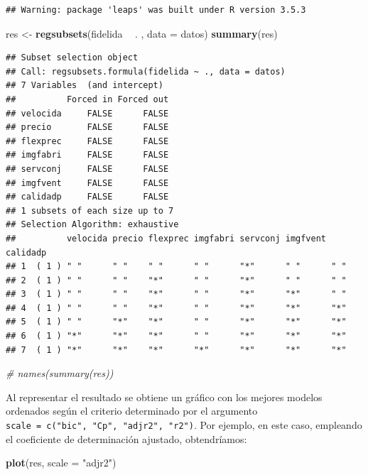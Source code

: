 \documentclass[]{book}
\newenvironment{Shaded}{\begin{snugshade}}{\end{snugshade}}
\newcommand{\KeywordTok}[1]{\textcolor[rgb]{0.13,0.29,0.53}{\textbf{#1}}}
\newcommand{\DataTypeTok}[1]{\textcolor[rgb]{0.13,0.29,0.53}{#1}}
\newcommand{\StringTok}[1]{\textcolor[rgb]{0.31,0.60,0.02}{#1}}
\newcommand{\CommentTok}[1]{\textcolor[rgb]{0.56,0.35,0.01}{\textit{#1}}}
\newcommand{\OperatorTok}[1]{\textcolor[rgb]{0.81,0.36,0.00}{\textbf{#1}}}
\newcommand{\NormalTok}[1]{#1}
\begin{document}
\begin{verbatim}
## Warning: package 'leaps' was built under R version 3.5.3
\end{verbatim}

\begin{Shaded}
\begin{Highlighting}[]
\NormalTok{res <-}\StringTok{ }\KeywordTok{regsubsets}\NormalTok{(fidelida }\OperatorTok{~}\StringTok{ }\NormalTok{. , }\DataTypeTok{data =}\NormalTok{ datos)}
\KeywordTok{summary}\NormalTok{(res)}
\end{Highlighting}
\end{Shaded}

\begin{verbatim}
## Subset selection object
## Call: regsubsets.formula(fidelida ~ ., data = datos)
## 7 Variables  (and intercept)
##          Forced in Forced out
## velocida     FALSE      FALSE
## precio       FALSE      FALSE
## flexprec     FALSE      FALSE
## imgfabri     FALSE      FALSE
## servconj     FALSE      FALSE
## imgfvent     FALSE      FALSE
## calidadp     FALSE      FALSE
## 1 subsets of each size up to 7
## Selection Algorithm: exhaustive
##          velocida precio flexprec imgfabri servconj imgfvent calidadp
## 1  ( 1 ) " "      " "    " "      " "      "*"      " "      " "     
## 2  ( 1 ) " "      " "    "*"      " "      "*"      " "      " "     
## 3  ( 1 ) " "      " "    "*"      " "      "*"      "*"      " "     
## 4  ( 1 ) " "      " "    "*"      " "      "*"      "*"      "*"     
## 5  ( 1 ) " "      "*"    "*"      " "      "*"      "*"      "*"     
## 6  ( 1 ) "*"      "*"    "*"      " "      "*"      "*"      "*"     
## 7  ( 1 ) "*"      "*"    "*"      "*"      "*"      "*"      "*"
\end{verbatim}

\begin{Shaded}
\begin{Highlighting}[]
\CommentTok{# names(summary(res))}
\end{Highlighting}
\end{Shaded}

Al representar el resultado se obtiene un gráfico con los mejores
modelos ordenados según el criterio determinado por el argumento
\texttt{scale\ =\ c("bic",\ "Cp",\ "adjr2",\ "r2")}. Por ejemplo, en
este caso, empleando el coeficiente de determinación ajustado,
obtendríamos:

\begin{Shaded}
\begin{Highlighting}[]
\KeywordTok{plot}\NormalTok{(res, }\DataTypeTok{scale =} \StringTok{"adjr2"}\NormalTok{)}
\end{Highlighting}
\end{Shaded}
\end{document}
